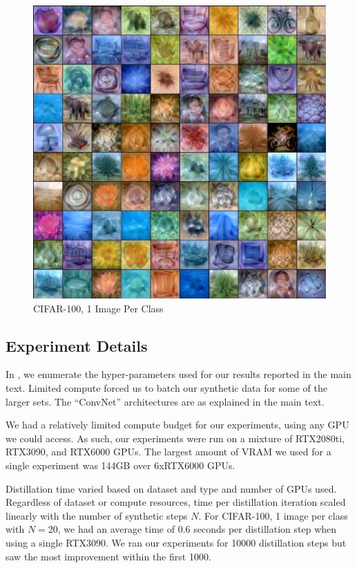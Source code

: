 \documentclass[main.tex]{subfiles}
\begin{document}
\begin{figure}
    \centering
    \includegraphics[width=\linewidth]{figures/CIFAR100.pdf}
    \caption{CIFAR-100, 1 Image Per Class}
    \vspace{-9pt}
\end{figure}

\subsection{Experiment Details}
In , we enumerate the hyper-parameters used for our results reported in the main text. Limited compute forced us to batch our synthetic data for some of the larger sets. The ``ConvNet'' architectures are as explained in the main text.


 We had a relatively limited compute budget for our experiments, using any GPU we could access. As such, our experiments were run on a mixture of RTX2080ti, RTX3090, and RTX6000 GPUs. The largest amount of VRAM we used for a single experiment was 144GB over 6xRTX6000 GPUs.

 Distillation time varied based on dataset and type and number of GPUs used. Regardless of dataset or compute resources, time per distillation iteration scaled linearly with the number of synthetic steps $N$. For CIFAR-100, 1 image per class with $N=20$, we had an average time of 0.6 seconds per distillation step when using a single RTX3090. We ran our experiments for 10000 distillation steps but saw the most improvement within the first 1000.
\end{document}
